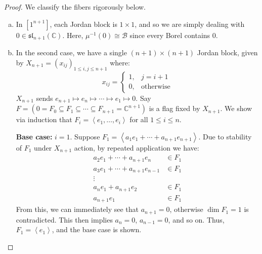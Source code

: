 \documentclass[11pt]{article}
\newcommand{\C}{\mathbb{C}}
\theoremstyle{definition}
\numberwithin{equation}{section} %
\begin{document}
\begin{proof}
We classify the fibers rigorously below.
    \begin{enumerate}[(a)]
        \item In $\left[1^{n+1}\right]$, each Jordan block is $1\times 1$, and so we are simply dealing with $0\in \mathfrak{sl}_{n+1}(\C)$. Here, $\mu^{-1}(0) \cong \mathcal{B}$ since every Borel contains $0$.

        \item In the second case, we have a single $(n+1)\times (n+1)$ Jordan block, given by $X_{n+1} = \left(x_{ij}\right)_{1\leq i,j\leq n+1}$ where:
        $$
        x_{ij} = \begin{cases} 1, & j=i+1 \\ 0, &\text{otherwise} \end{cases}
        $$
        $X_{n+1}$ sends $e_{n+1}\mapsto e_n \mapsto \cdots \mapsto e_1\mapsto 0$. Say $F = \left(0=F_0\subseteq F_1\subseteq \cdots \subseteq F_{n+1} = \C^{n+1}\right)$ is a flag fixed by $X_{n+1}$. We show via induction that $F_i = \left\langle e_1, \ldots, e_i\right\rangle$ for all $1\leq i\leq n$. 

        \smallskip

        \noindent \textbf{Base case:} $i=1$. Suppose $F_1 = \left\langle a_1e_1 + \cdots + a_{n+1}e_{n+1}\right\rangle$. Due to stability of $F_1$ under $X_{n+1}$ action, by repeated application we have:
        \begin{align*}
        a_2e_1 + \cdots + a_{n+1}e_{n} &\in F_1 \\
        a_3e_1 + \cdots + a_{n+1}e_{n-1} & \in F_1 \\
        \vdots \\
        a_{n} e_1 + a_{n+1}e_2 &\in F_1 \\
        a_{n+1}e_1 & \in F_1
        \end{align*}
        From this, we can immediately see that $a_{n+1} =0$, otherwise $\dim F_1 =1$ is contradicted. This then implies $a_n =0$, $a_{n-1}=0$, and so on. Thus, $F_1 = \left\langle e_1\right\rangle$, and the base case is shown.

        \smallskip


\end{enumerate}
\end{proof}
\end{document}
